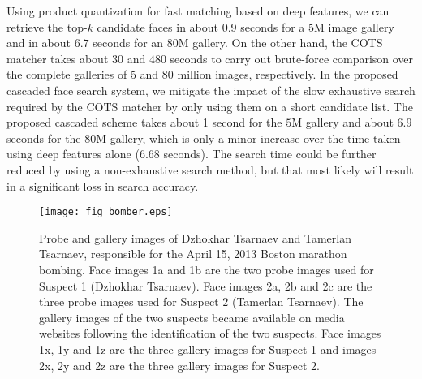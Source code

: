 \documentclass[10pt,journal,compsoc]{IEEEtran}
\begin{document}
Using product quantization for fast matching based on deep features, we can retrieve the top-$k$ candidate faces in about $0.9$ seconds for a $5$M image gallery and in about $6.7$ seconds for an $80$M gallery. On the other hand, the COTS matcher takes about $30$ and $480$ seconds to carry out brute-force comparison over the complete galleries of $5$ and $80$ million images, respectively. In the proposed cascaded face search system, we mitigate the impact of the slow exhaustive search required by the COTS matcher by only using them on a short candidate list. The proposed cascaded scheme takes about 1 second for the $5$M gallery and about $6.9$ seconds for the $80$M gallery, which is only a minor increase over the time taken using deep features alone ($6.68$ seconds). The search time could be further reduced by using a non-exhaustive search method, but that most likely will result in a significant loss in search accuracy.
\begin{figure}[htbp]
\centering
\texttt{[image: fig\_bomber.eps]}
\caption{Probe and gallery images of Dzhokhar Tsarnaev and Tamerlan Tsarnaev, responsible for the April 15, 2013 Boston marathon bombing. Face images 1a and 1b are the two probe images used for Suspect 1 (Dzhokhar Tsarnaev). Face images 2a, 2b and 2c are the three probe images used for Suspect 2 (Tamerlan Tsarnaev). The gallery images of the two suspects became available on media websites following the identification of the two suspects. Face images 1x, 1y and 1z are the three gallery images for Suspect 1 and images 2x, 2y and 2z are the three gallery images for Suspect 2.}
\label{fig:bombers}
\end{figure}
\end{document}
